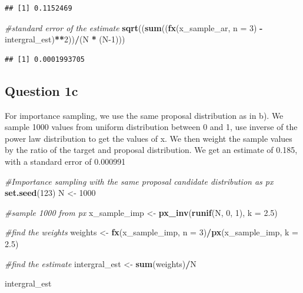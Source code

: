 \documentclass[
]{article}
\newenvironment{Shaded}{\begin{snugshade}}{\end{snugshade}}
\newcommand{\AttributeTok}[1]{\textcolor[rgb]{0.13,0.29,0.53}{#1}}
\newcommand{\CommentTok}[1]{\textcolor[rgb]{0.56,0.35,0.01}{\textit{#1}}}
\newcommand{\DecValTok}[1]{\textcolor[rgb]{0.00,0.00,0.81}{#1}}
\newcommand{\FloatTok}[1]{\textcolor[rgb]{0.00,0.00,0.81}{#1}}
\newcommand{\FunctionTok}[1]{\textcolor[rgb]{0.13,0.29,0.53}{\textbf{#1}}}
\newcommand{\NormalTok}[1]{#1}
\newcommand{\OtherTok}[1]{\textcolor[rgb]{0.56,0.35,0.01}{#1}}
\newcommand{\SpecialCharTok}[1]{\textcolor[rgb]{0.81,0.36,0.00}{\textbf{#1}}}
\begin{document}
\begin{verbatim}
## [1] 0.1152469
\end{verbatim}

\begin{Shaded}
\begin{Highlighting}[]
\CommentTok{\#standard error of the estimate}
\FunctionTok{sqrt}\NormalTok{((}\FunctionTok{sum}\NormalTok{((}\FunctionTok{fx}\NormalTok{(x\_sample\_ar, }\AttributeTok{n =} \DecValTok{3}\NormalTok{) }\SpecialCharTok{{-}}\NormalTok{ intergral\_est)}\SpecialCharTok{**}\DecValTok{2}\NormalTok{))}\SpecialCharTok{/}\NormalTok{(N }\SpecialCharTok{*}\NormalTok{ (N}\DecValTok{{-}1}\NormalTok{)))}
\end{Highlighting}
\end{Shaded}

\begin{verbatim}
## [1] 0.0001993705
\end{verbatim}

\hypertarget{question-1c}{%
\subsection{Question 1c}\label{question-1c}}

For importance sampling, we use the same proposal distribution as in b).
We sample 1000 values from uniform distribution between 0 and 1, use
inverse of the power law distribution to get the values of x. We then
weight the sample values by the ratio of the target and proposal
distribution. We get an estimate of 0.185, with a standard error of
0.000991

\begin{Shaded}
\begin{Highlighting}[]
\CommentTok{\#Importance sampling with the same proposal candidate distribution as px}
\FunctionTok{set.seed}\NormalTok{(}\DecValTok{123}\NormalTok{)}
\NormalTok{N }\OtherTok{\textless{}{-}} \DecValTok{1000}

\CommentTok{\#sample 1000 from px}
\NormalTok{x\_sample\_imp }\OtherTok{\textless{}{-}} \FunctionTok{px\_inv}\NormalTok{(}\FunctionTok{runif}\NormalTok{(N, }\DecValTok{0}\NormalTok{, }\DecValTok{1}\NormalTok{), }\AttributeTok{k =} \FloatTok{2.5}\NormalTok{)}

\CommentTok{\#find the weights}
\NormalTok{weights }\OtherTok{\textless{}{-}} \FunctionTok{fx}\NormalTok{(x\_sample\_imp, }\AttributeTok{n =} \DecValTok{3}\NormalTok{)}\SpecialCharTok{/}\FunctionTok{px}\NormalTok{(x\_sample\_imp, }\AttributeTok{k =} \FloatTok{2.5}\NormalTok{)}

\CommentTok{\#find the estimate}
\NormalTok{intergral\_est }\OtherTok{\textless{}{-}} \FunctionTok{sum}\NormalTok{(weights)}\SpecialCharTok{/}\NormalTok{N}

\NormalTok{intergral\_est}
\end{Highlighting}
\end{Shaded}
\end{document}
